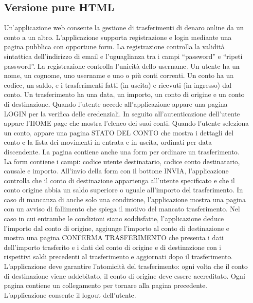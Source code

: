 \documentclass{article}
\begin{document}
\subsection{Versione pure HTML}
Un’applicazione web consente la gestione di trasferimenti di denaro online da un conto a un
altro. L’applicazione supporta registrazione e login mediante una pagina pubblica con
opportune form. La registrazione controlla la validità sintattica dell’indirizzo di email e
l’uguaglianza tra i campi “password” e “ripeti password”. La registrazione controlla l’unicità
dello username. Un utente ha un nome, un cognome, uno username e uno o più conti correnti.
Un conto ha un codice, un saldo, e i trasferimenti fatti (in uscita) e ricevuti (in ingresso) dal
conto. Un trasferimento ha una data, un importo, un conto di origine e un conto di destinazione.
Quando l’utente accede all’applicazione appare una pagina LOGIN per la verifica delle
credenziali. In seguito all’autenticazione dell’utente appare l’HOME page che mostra l’elenco
dei suoi conti. Quando l’utente seleziona un conto, appare una pagina STATO DEL CONTO
che mostra i dettagli del conto e la lista dei movimenti in entrata e in uscita, ordinati per data
discendente. La pagina contiene anche una form per ordinare un trasferimento. La form
contiene i campi: codice utente destinatario, codice conto destinatario, causale e importo.
All’invio della form con il bottone INVIA, l’applicazione controlla che il conto di destinazione
appartenga all’utente specificato e che il conto origine abbia un saldo superiore o uguale
all’importo del trasferimento. In caso di mancanza di anche solo una condizione, l’applicazione
mostra una pagina con un avviso di fallimento che spiega il motivo del mancato trasferimento.
Nel caso in cui entrambe le condizioni siano soddisfatte, l’applicazione deduce l’importo dal
conto di origine, aggiunge l’importo al conto di destinazione e mostra una pagina CONFERMA
TRASFERIMENTO che presenta i dati dell’importo trasferito e i dati del conto di origine e di
destinazione con i rispettivi saldi precedenti al trasferimento e aggiornati dopo il trasferimento.
L’applicazione deve garantire l’atomicità del trasferimento: ogni volta che il conto di
destinazione viene addebitato, il conto di origine deve essere accreditato. Ogni pagina
contiene un collegamento per tornare alla pagina precedente. L’applicazione consente il
logout dell’utente.

\pagebreak
\end{document}
